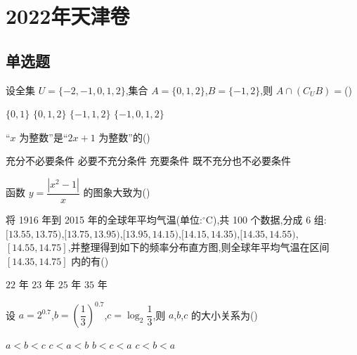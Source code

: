 \chapter{2022年天津卷}

\section{单选题}

\begin{problem}
设全集 \(U=\{-2,-1,0,1,2\}\),集合 \(A=\{0,1,2\}\),\(B=\{-1,2\}\),则 \(A\cap\left(C_UB\right)=\)(\quad)

\choices
    {\(\{0,1\}\)}
    {\(\{0,1,2\}\)}
    {\(\{-1,1,2\}\)}
    {\(\{-1,0,1,2\}\)}
\end{problem}

\begin{problem}
``\(x\) 为整数''是``\(2x+1\) 为整数''的(\quad)

\choices
    {充分不必要条件}
    {必要不充分条件}
    {充要条件}
    {既不充分也不必要条件}
\end{problem}

\begin{problem}
函数 \(y=\dfrac{|x^2-1|}{x}\) 的图象大致为(\quad)

\choices
    {}
    {}
    {}
    {}
\end{problem}

\begin{problem}
将 1916 年到 2015 年的全球年平均气温(单位:\({}^{\circ}\mathrm C\)),共 100 个数据,分成 6 组:\([13.55,13.75)\),\([13.75,13.95)\),\([13.95,14.15)\),\([14.15,14.35)\),\([14.35,14.55)\),\([14.55,14.75]\),并整理得到如下的频率分布直方图,则全球年平均气温在区间 \([14.35,14.75]\) 内的有(\quad)


\choices
    {\(22\text{ 年}\)}
    {\(23\text{ 年}\)}
    {\(25\text{ 年}\)}
    {\(35\text{ 年}\)}
\end{problem}

\begin{problem}
设 \(a=2^{0.7}\),\(b=\left(\dfrac{1}{3}\right)^{0.7}\),\(c=\log_2\dfrac{1}{3}\),则 \(a\),\(b\),\(c\) 的大小关系为(\quad)

\choices
    {\(a<b<c\)}
    {\(c<a<b\)}
    {\(b<c<a\)}
    {\(c<b<a\)}
\end{problem}

